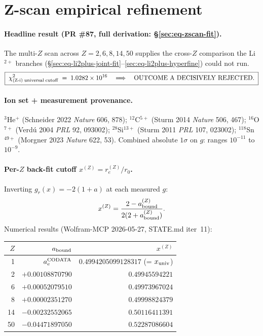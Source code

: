 \section{Z-scan empirical refinement}
\label{sec:zscan-refinement}

\paragraph{Headline result (PR \#87, full derivation: \S\ref{sec:eq-zscan-fit}).}
The multi-$Z$ scan across $Z = 2, 6, 8, 14, 50$ supplies the
cross-$Z$ comparison the Li$^{2+}$ branches (\S\ref{sec:eq-li2plus-joint-fit}--\ref{sec:eq-li2plus-hyperfine}) could not run.
\[
\boxed{\;
  \chi^2_{\rm (Z\text{-}i)\;universal\;cutoff} \;=\; 1.0282\times 10^{16}
  \quad\Longrightarrow\quad \text{OUTCOME A DECISIVELY REJECTED.}
\;}
\]

\paragraph{Ion set + measurement provenance.}
$^3$He$^+$ (Schneider 2022 \emph{Nature} 606, 878);
$^{12}$C$^{5+}$ (Sturm 2014 \emph{Nature} 506, 467);
$^{16}$O$^{7+}$ (Verd\'u 2004 \emph{PRL} 92, 093002);
$^{28}$Si$^{13+}$ (Sturm 2011 \emph{PRL} 107, 023002);
$^{118}$Sn$^{49+}$ (Morgner 2023 \emph{Nature} 622, 53). Combined absolute
$1\sigma$ on $g$: ranges $10^{-11}$ to $10^{-9}$.

\paragraph{Per-$Z$ back-fit cutoff $x^{(Z)} = r_e^{(Z)}/r_0$.}
Inverting $g_r(x) = -2(1 + a)$ at each measured $g$:
\[
x^{(Z)} = \frac{2 - a_{\rm bound}^{(Z)}}{2(2 + a_{\rm bound}^{(Z)})}.
\]
Numerical results (Wolfram-MCP 2026-05-27, STATE.md iter~11):
\begin{center}
\begin{tabular}{rrr}
\toprule
$Z$ & $a_{\rm bound}$       & $x^{(Z)}$ \\
\midrule
1  & $a_e^{\rm CODATA}$    & $0.4994205099128317$ (= $x_{\rm univ}$) \\
2  & $+0.00108870790$      & $0.49945594221$ \\
6  & $+0.00052079510$      & $0.49973967024$ \\
8  & $+0.00002351270$      & $0.49998824379$ \\
14 & $-0.00232552065$      & $0.50116411391$ \\
50 & $-0.04471897050$      & $0.52287086604$ \\
\bottomrule
\end{tabular}
\end{center}

